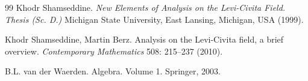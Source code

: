 \documentclass[a4paper,12pt]{amsart}
\theoremstyle{definition}
\begin{document}
\begin{thebibliography}{99}
Khodr Shamseddine. {\em New Elements of Analysis on the Levi-Civita Field. Thesis (Sc. D.)} Michigan State University, East Lansing, Michigan, USA (1999).

Khodr Shamseddine, Martin Berz.
Analysis on the {L}evi-{C}ivita field, a brief overview. \emph{Contemporary Mathematics} 508: 215--237 (2010).

B.L. van der Waerden. Algebra. Volume 1. Springer, 2003.
    \end{thebibliography}
\end{document}
